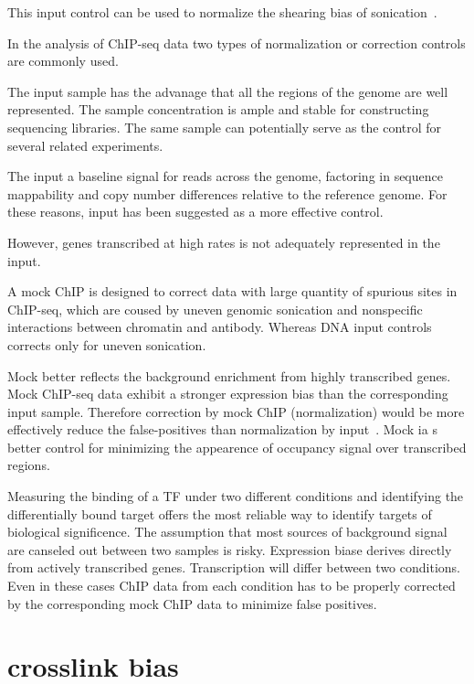 This input control can be used to normalize the shearing bias of sonication~\cite{kharchenko2008design}.

In the analysis of ChIP-seq data two types of normalization or correction controls are commonly used.

The input sample has the advanage that all the regions of the genome are well represented.
The sample concentration is ample and stable for constructing sequencing libraries.
The same sample can potentially serve as the control for several related experiments.

The input a baseline signal for reads across the genome, factoring in sequence mappability and copy number differences relative to the reference genome.
For these reasons, input has been suggested as a more effective control.

However, genes transcribed at high rates is not adequately represented in the input.

A mock ChIP is designed to correct data with large quantity of spurious sites in ChIP-seq, which are coused by uneven genomic sonication and nonspecific interactions between chromatin and antibody.
Whereas DNA input controls corrects only for uneven sonication.

Mock better reflects the background enrichment from highly transcribed genes.
Mock ChIP-seq data exhibit a stronger expression bias than the corresponding input sample.
Therefore correction by mock ChIP (normalization) would be more effectively reduce the false-positives than normalization by input~\cite{park2013widespread}.
Mock ia s better control for minimizing the appearence of occupancy signal over transcribed regions.

Measuring the binding of a TF under two different conditions and identifying the differentially bound target offers the most reliable way to identify targets of biological significence.
The assumption that most sources of background signal are canseled out between two samples is risky.
Expression biase derives directly from actively transcribed genes.
Transcription will differ between two conditions.
Even in these cases ChIP data from each condition has to be properly corrected by the corresponding mock ChIP data to minimize false positives.

\section{crosslink bias}

